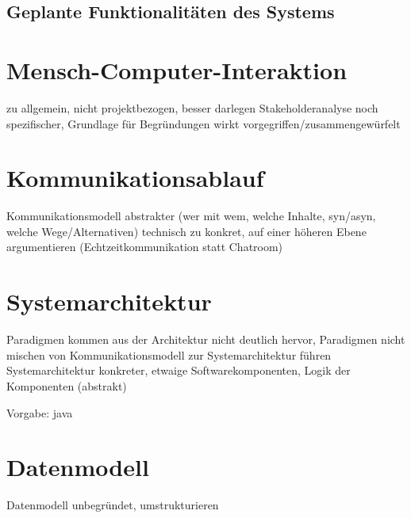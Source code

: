 \documentclass[12pt]{scrartcl}
\begin{document}
\subsection[Geplante Funktionalitäten]{Geplante Funktionalitäten des Systems}



\section{Mensch-Computer-Interaktion}

zu allgemein, nicht projektbezogen, besser darlegen
Stakeholderanalyse noch spezifischer, Grundlage für Begründungen
wirkt vorgegriffen/zusammengewürfelt


\section{Kommunikationsablauf}

Kommunikationsmodell abstrakter (wer mit wem, welche Inhalte, syn/asyn, welche Wege/Alternativen)
technisch zu konkret, auf einer höheren Ebene argumentieren (Echtzeitkommunikation statt Chatroom)




\section{Systemarchitektur}

Paradigmen kommen aus der Architektur nicht deutlich hervor, Paradigmen nicht mischen
von Kommunikationsmodell zur Systemarchitektur führen
Systemarchitektur konkreter, etwaige Softwarekomponenten, Logik der Komponenten (abstrakt)

Vorgabe: java


\section{Datenmodell}

Datenmodell unbegründet, umstrukturieren
\end{document}
